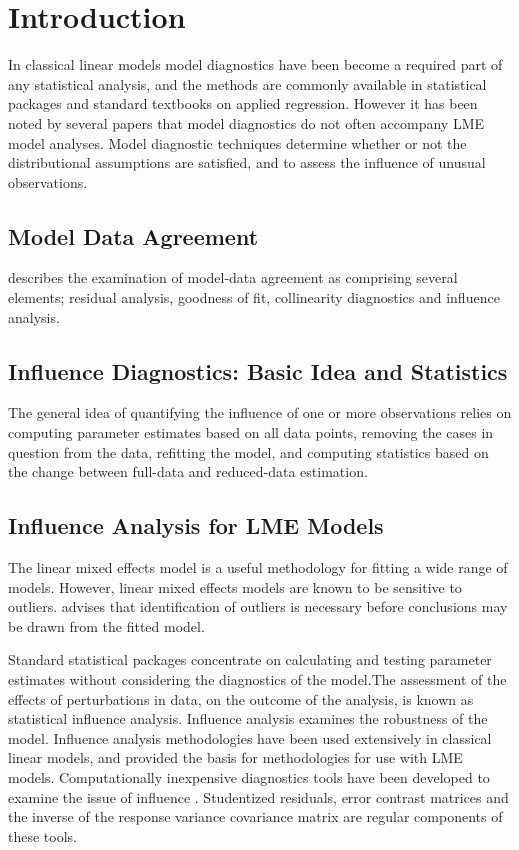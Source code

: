 \documentclass[Main.tex]{subfiles}
\begin{document}
\newpage
\section{Introduction}%
In classical linear models model diagnostics have been become a required part of any statistical analysis, and the methods are commonly available in statistical packages and standard textbooks on applied regression. However it has been noted by several papers that model diagnostics do not often accompany LME model analyses.
Model diagnostic techniques determine whether or not the distributional assumptions are satisfied, and to assess the influence of unusual observations.

\subsection{Model Data Agreement} %
\citet{schabenberger} describes the examination of model-data agreement as comprising several elements; residual analysis, goodness of fit, collinearity diagnostics and influence analysis.

\subsection{Influence Diagnostics: Basic Idea and Statistics} %

The general idea of quantifying the influence of one or more observations relies on computing parameter estimates based on all data points, removing the cases in question from the data, refitting the model, and computing statistics based on the change between full-data and reduced-data estimation. 



\subsection{Influence Analysis for LME Models} %
The linear mixed effects model is a useful methodology for fitting a wide range of models. However, linear mixed effects models are known to be sensitive to outliers. \citet{CPJ} advises that identification of outliers is necessary before conclusions may be drawn from the fitted model.

Standard statistical packages concentrate on calculating and testing parameter estimates without considering the diagnostics of the model.The assessment of the effects of perturbations in data, on the outcome of the analysis, is known as statistical influence analysis. Influence analysis examines the robustness of the model. Influence analysis methodologies have been used extensively in classical linear models, and provided the basis for methodologies for use with LME models.
Computationally inexpensive diagnostics tools have been developed to examine the issue of influence \citep{Zewotir}.
Studentized residuals, error contrast matrices and the inverse of the response variance covariance matrix are regular components of these tools.
\end{document}
